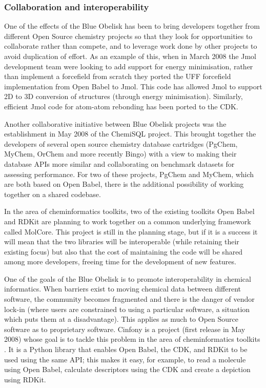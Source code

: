 \documentclass[10pt]{bmc_article}
\newenvironment{bmcformat}{\begin{raggedright}\baselineskip20pt\sloppy\setboolean{publ}{false}}{\end{raggedright}\baselineskip20pt\sloppy}
\begin{document}
\begin{bmcformat}
  \subsubsection*{Collaboration and interoperability}

One of the effects of the Blue Obelisk has been to bring developers
together from different Open Source chemistry projects so that they
look for opportunities to collaborate rather than compete, and to
leverage work done by other projects to avoid duplication of effort.
As an example of this, when in March 2008 the Jmol development team
were looking to add support for energy minimisation, rather than
implement a forcefield from scratch they ported the UFF forcefield
implementation from Open Babel to Jmol. This code has allowed Jmol to
support 2D to 3D conversion of structures (through energy
minimisation). Similarly, efficient Jmol code for atom-atom rebonding
has been ported to the CDK.

Another collaborative initiative between Blue Obelisk projects was the establishment in May 2008 of
the ChemiSQL project. This brought together the developers of several
open source chemistry database cartridges (PgChem, MyChem, OrChem and
more recently Bingo) with a view to making their database APIs more
similar and collaborating on benchmark datasets for assessing
performance. For two of these projects, PgChem and MyChem, which are both based on
Open Babel, there is the additional possibility of working together on a shared
codebase.

In the area of cheminformatics toolkits, two of the existing toolkits
Open Babel and RDKit are planning to work together on a common
underlying framework called MolCore. This project is still in the
planning stage, but if it is a success it will mean that the two
libraries will be interoperable (while retaining their existing focus)
but also that the cost of maintaining the code will be shared among
more developers, freeing time for the development of new features.

One of the goals of the Blue Obelisk is to promote interoperability in chemical
informatics. When barriers exist to moving chemical data between
different software, the community becomes fragmented and there is
the danger of vendor lock-in (where users are constrained to using
a particular software, a situation which puts them at a
disadvantage). This applies as much to Open Source software as to
proprietary software. Cinfony is a project (first release in May 2008)
whose goal is to tackle this problem in the area of cheminformatics
toolkits \cite{OBoyleCinfony2008}.
It is a Python library that enables Open Babel, the CDK, and RDKit to
be used using the same API; this makes it easy, for example, to read a
molecule using Open Babel, calculate descriptors using the CDK and
create a depiction using RDKit.


\end{bmcformat}
\end{document}

